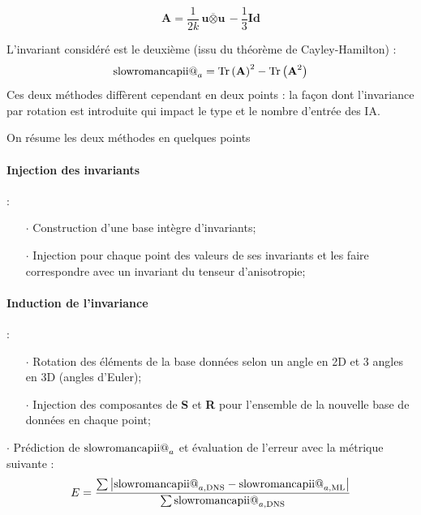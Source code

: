 \documentclass[a4paper,12pt]{report}
\makeatletter
\numberwithin{equation}{section} %
\newcommand*{\rom}[1]{\expandafter\@slowromancap\romannumeral #1@}
\makeatother
\begin{document}
\begin{equation*}
\textbf{A} = \frac{1}{2k} \overline{\textbf{u} \otimes \textbf{u}} - \frac{1}{3}\textbf{Id}
\end{equation*}

\noindent L'invariant considéré est le deuxième (issu du théorème de Cayley-Hamilton) :
\begin{equation*}
\text{\rom{2}}_a = \text{Tr} \left(\textbf{A}\right)^2 - \text{Tr} \left(\textbf{A}^2 \right)
\end{equation*}
 Ces deux méthodes diffèrent cependant en deux points : la façon dont l'invariance par rotation est introduite qui impact le type et le nombre d'entrée des IA.
 
\noindent On résume les deux méthodes en quelques points \\
 
\begin{multicols}{2}
\centering \paragraph*{Injection des invariants} :\\
\begin{itemize}
\item[$\cdot$] Construction d'une base intègre d'invariants;
\item[$\cdot$] Injection pour chaque point des valeurs de ses invariants et les faire correspondre avec un invariant du tenseur d'anisotropie;
\end{itemize}

\columnbreak

\centering \paragraph*{Induction de l'invariance} : \\
\begin{itemize}
\item[$\cdot$] Rotation des éléments de la base données selon un angle en 2D et 3 angles en 3D (angles d'Euler);
\item[$\cdot$] Injection des composantes de \textbf{S} et \textbf{R} pour l'ensemble de la nouvelle base de données en chaque point;
\end{itemize}
\end{multicols}
\centering $\cdot$ Prédiction de $\text{\rom{2}}_a$ et évaluation de l'erreur avec la métrique suivante : $$ E = \frac{\sum \left \vert \text{\rom{2}}_{a, \text{DNS}} - \text{\rom{2}}_{a, \text{ML}} \right \vert  }{\sum \text{\rom{2}}_{a, \text{DNS}}}$$ \\[0.2cm]
\raggedright
\end{document}
